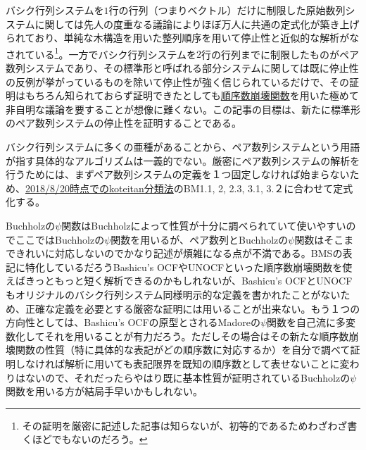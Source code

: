 \documentclass[dvipdfmx,uplatex]{jsarticle}
\theoremstyle{customnonumberbreakfortheorem}
\theoremstyle{customnonumberbreakforproof}
\begin{document}
バシク行列システムを\(1\)行の行列（つまりベクトル）だけに制限した原始数列システムに関しては先人の度重なる議論によりほぼ万人に共通の定式化が築き上げられており、単純な木構造を用いた整列順序を用いて停止性と近似的な解析がなされている\footnote{その証明を厳密に記述した記事は知らないが、初等的であるためわざわざ書くほどでもないのだろう。}。一方でバシク行列システムを\(2\)行の行列までに制限したものがペア数列システムであり、その標準形と呼ばれる部分システムに関しては既に停止性の反例が挙がっているものを除いて停止性が強く信じられているだけで、その証明はもちろん知られておらず証明できたとしても\href{http://ja.googology.wikia.com/wiki/\%E3\%82\%AB\%E3\%83\%86\%E3\%82\%B4\%E3\%83\%AA:\%E9\%A0\%86\%E5\%BA\%8F\%E6\%95\%B0\%E5\%B4\%A9\%E5\%A3\%8A\%E9\%96\%A2\%E6\%95\%B0}{順序数崩壊関数}を用いた極めて非自明な議論を要することが想像に難くない。この記事の目標は、新たに標準形のペア数列システムの停止性を証明することである。

バシク行列システムに多くの亜種があることから、ペア数列システムという用語が指す具体的なアルゴリズムは一義的でない。厳密にペア数列システムの解析を行うためには、まずペア数列システムの定義を１つ固定しなければ始まらないため、\href{http://ja.googology.wikia.com/wiki/\%E3\%83\%A6\%E3\%83\%BC\%E3\%82\%B6\%E3\%83\%BC\%E3\%83\%96\%E3\%83\%AD\%E3\%82\%B0:Koteitan/\%E3\%83\%90\%E3\%82\%B7\%E3\%82\%AF\%E8\%A1\%8C\%E5\%88\%97\%E3\%81\%AE\%E4\%BA\%9C\%E7\%A8\%AE\%E3\%83\%AB\%E3\%83\%BC\%E3\%83\%AB\%E3\%81\%AE\%E5\%88\%86\%E9\%A1\%9E?oldid=15499}{2018/8/20時点でのkoteitan分類法}のBM1.1, 2, 2.3, 3.1, 3.２に合わせて定式化する。

Buchholzの\(\psi\)関数はBuchholzによって性質が十分に調べられていて使いやすいのでここではBuchholzの\(\psi\)関数を用いるが、ペア数列とBuchholzの\(\psi\)関数はそこまできれいに対応しないのでかなり記述が煩雑になる点が不満である。BMSの表記に特化しているだろうBashicu's OCFやUNOCFといった順序数崩壊関数を使えばきっともっと短く解析できるのかもしれないが、Bashicu's OCFとUNOCFもオリジナルのバシク行列システム同様明示的な定義を書かれたことがないため、正確な定義を必要とする厳密な証明には用いることが出来ない。もう１つの方向性としては、Bashicu's OCFの原型とされるMadoreの\(\psi\)関数を自己流に多変数化してそれを用いることが有力だろう。ただしその場合はその新たな順序数崩壊関数の性質（特に具体的な表記がどの順序数に対応するか）を自分で調べて証明しなければ解析に用いても表記限界を既知の順序数として表せないことに変わりはないので、それだったらやはり既に基本性質が証明されているBuchholzの\(\psi\)関数を用いる方が結局手早いかもしれない。

\fi
\end{document}
